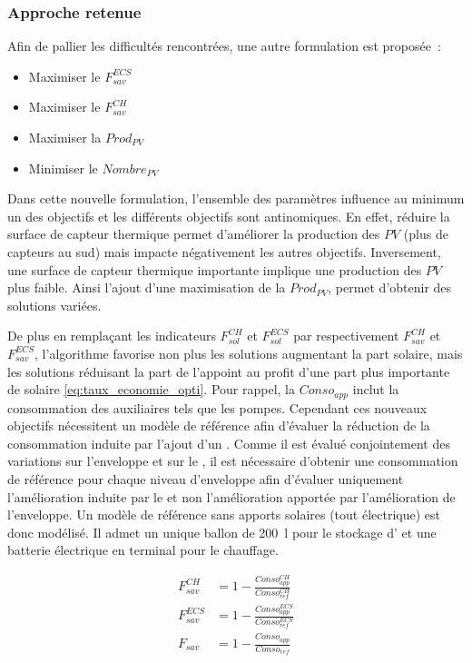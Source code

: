 \subsubsection{Approche retenue} %
\label{ssub:approche_retenue}
\noindent Afin de pallier les difficultés rencontrées, une autre formulation est proposée~:
\begin{itemize}
  \item Maximiser le $F_{sav}^{ECS}$
  \item Maximiser le $F_{sav}^{CH}$
  \item Maximiser la $Prod_{PV}$
  \item Minimiser le $Nombre_{PV}$
\end{itemize}

Dans cette nouvelle formulation, l’ensemble des paramètres influence au minimum un des
objectifs et les différents objectifs sont antinomiques.
En effet, réduire la surface de capteur thermique permet d’améliorer la production des
$PV$ (plus de capteurs au sud) mais impacte négativement les autres objectifs.
Inversement, une surface de capteur thermique importante implique une production des $PV$
plus faible. Ainsi l’ajout d’une maximisation de la $Prod_{PV}$, permet d’obtenir des
solutions variées.

De plus en remplaçant les indicateurs $F_{sol}^{CH}$ et $F_{sol}^{ECS}$ par respectivement
$F_{sav}^{CH}$ et $F_{sav}^{ECS}$, l’algorithme favorise non plus les solutions augmentant
la part solaire, mais les solutions réduisant la part de l’appoint au profit d’une part
plus importante de solaire \eqref{eq:taux_economie_opti}. Pour rappel, la $Conso_{app}$
inclut la consommation des auxiliaires tels que les pompes. Cependant ces nouveaux
objectifs nécessitent un modèle de référence afin d’évaluer la réduction de la
consommation induite par l’ajout d’un . Comme il est évalué conjointement des
variations sur l’enveloppe et sur le , il est nécessaire d’obtenir une
consommation de référence pour chaque niveau d’enveloppe afin d’évaluer uniquement
l’amélioration induite par le  et non l’amélioration apportée par l’amélioration
de l’enveloppe. Un modèle de référence sans apports solaires (tout électrique) est donc
modélisé. Il admet un unique ballon de \SI{200}{\litre} pour le stockage d’ et
une batterie électrique en terminal pour le chauffage.

\begin{align}\label{eq:taux_economie_opti}
  F_{sav}^{CH}   &= 1 - \frac{Conso_{app}^{CH}}{Conso_{ref}^{CH}} \\
  F_{sav}^{ECS}  &= 1 - \frac{Conso_{app}^{ECS}}{Conso_{ref}^{ECS}} \\
  F_{sav}        &= 1 - \frac{Conso_{app}}{Conso_{ref}}
\end{align}

